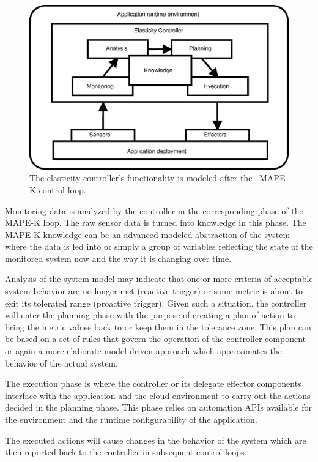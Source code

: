 \documentclass[english]{tktltiki2}
\theoremstyle{definition}
\theoremstyle{remark}
\begin{document}
\begin{figure}[h!]
	\includegraphics[width=\textwidth]{images/mape-k}
	\caption{The elasticity controller's functionality is modeled after the \mbox{
	MAPE-K} control loop.}
	\label{fig:mape-k}
\end{figure}

Monitoring data is analyzed by the controller in the corresponding phase of the
MAPE-K loop. The raw sensor data is turned into knowledge in this phase. The
MAPE-K knowledge can be an advanced modeled abstraction of the system where the
data is fed into or simply a group of variables reflecting the state of the
monitored system now and the way it is changing over time.

Analysis of the system model may indicate that one or more criteria of
acceptable system behavior are no longer met (reactive trigger) or some metric
is about to exit its tolerated range (proactive trigger). Given such a
situation, the controller will enter the planning phase with the purpose of creating
a plan of action to bring the metric values back to or keep them in the
tolerance zone. This plan can be based on a set of rules that govern the
operation of the controller component or again a more elaborate model driven
approach which approximates the behavior of the actual system.

The execution phase is where the controller or its delegate effector components
interface with the application and the cloud environment to carry out the actions
decided in the planning phase. This phase relies on automation APIs available
for the environment and the runtime configurability of the application.

The executed actions will cause changes in the behavior of the system which are
then reported back to the controller in subsequent control loops.
\end{document}
